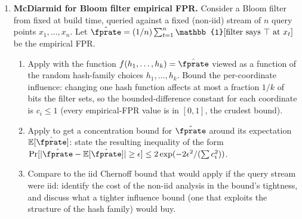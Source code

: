 \begin{enumerate}

\item \exstarstarstar
\label{ex:ch16-9}
\textbf{McDiarmid for Bloom filter empirical FPR.}
Consider a Bloom filter from  fixed at
build time, queried against a fixed (non-iid) stream of $n$ query
points $x_1, \ldots, x_n$. Let $\hat{\fprate} = (1 / n) \sum_{t = 1}^{n}
\mathbb{1}[\text{filter says } \top \text{ at } x_t]$ be the empirical
FPR.
\begin{enumerate}
  \item[(a)] Apply  with the function $f(h_1,
    \ldots, h_k) = \hat{\fprate}$ viewed as a function of the
    random hash-family choices $h_1, \ldots, h_k$. Bound the
    per-coordinate influence: changing one hash function affects
    at most a fraction $1 / k$ of bits the filter sets, so the
    bounded-difference constant for each coordinate is
    $c_i \le 1$ (every empirical-FPR value is in $[0, 1]$, the
    crudest bound).
  \item[(b)] Apply  to get a concentration
    bound for $\hat{\fprate}$ around its expectation
    $\mathbb{E}[\hat{\fprate}]$: state the resulting inequality
    of the form $\Pr[|\hat{\fprate} - \mathbb{E}[\hat{\fprate}]|
    \ge \epsilon] \le 2 \exp(-2 \epsilon^2 / (\sum c_i^2))$.
  \item[(c)] Compare to the iid Chernoff bound that would apply
    if the query stream were iid: identify the cost of the
    non-iid analysis in the bound's tightness, and discuss what
    a tighter influence bound (one that exploits the structure of
    the hash family) would buy.
\end{enumerate}


\end{enumerate}
